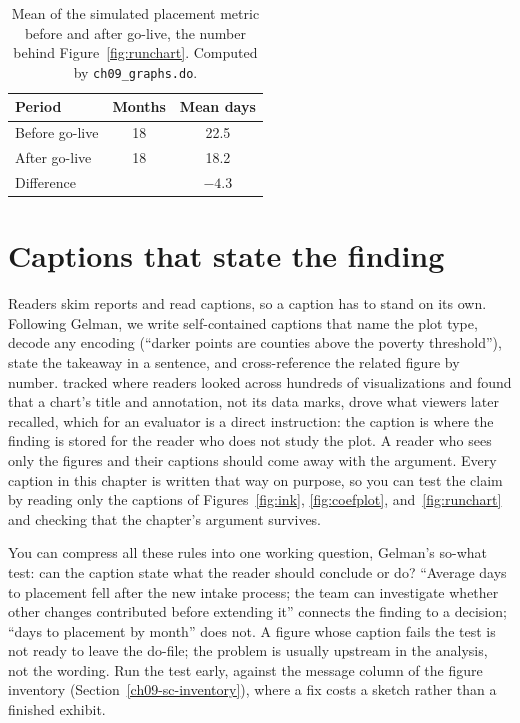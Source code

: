\begin{table}[htbp]
\centering
\caption[Before and after the intervention]{Mean of the simulated placement metric before and after go-live, the number behind Figure~\ref{fig:runchart}. Computed by \texttt{ch09\_graphs.do}.}
\label{tab:runsummary}
\begin{tabular}{lcc}
\hline
Period & Months & Mean days \\
\hline
Before go-live & 18 & 22.5 \\
After go-live  & 18 & 18.2 \\
\hline
Difference     &    & $-4.3$ \\
\hline
\end{tabular}
\end{table}

\section{Captions that state the finding}\label{sec:captions}
Readers skim reports and read captions, so a caption has to stand on its own. Following Gelman, we write self-contained captions that name the plot type, decode any encoding (\enquote{darker points are counties above the poverty threshold}), state the takeaway in a sentence, and cross-reference the related figure by number. \textcite{borkin2016beyond} tracked where readers looked across hundreds of visualizations and found that a chart's title and annotation, not its data marks, drove what viewers later recalled, which for an evaluator is a direct instruction: the caption is where the finding is stored for the reader who does not study the plot. A reader who sees only the figures and their captions should come away with the argument. Every caption in this chapter is written that way on purpose, so you can test the claim by reading only the captions of Figures~\ref{fig:ink}, \ref{fig:coefplot}, and~\ref{fig:runchart} and checking that the chapter's argument survives.

You can compress all these rules into one working question, Gelman's so-what test: can the caption state what the reader should conclude or do? \enquote{Average days to placement fell after the new intake process; the team can investigate whether other changes contributed before extending it} connects the finding to a decision; \enquote{days to placement by month} does not. A figure whose caption fails the test is not ready to leave the do-file; the problem is usually upstream in the analysis, not the wording. Run the test early, against the message column of the figure inventory (Section~\ref{ch09-sc-inventory}), where a fix costs a sketch rather than a finished exhibit.

